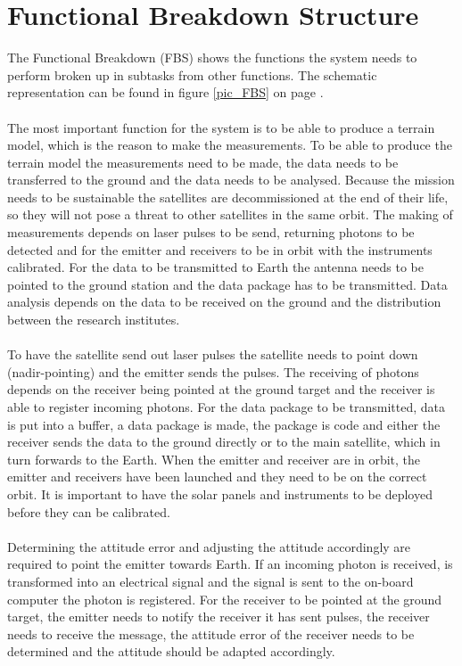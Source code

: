 \section{Functional Breakdown Structure}
The Functional Breakdown (FBS) shows the functions the system needs to perform broken up in subtasks from other functions. The schematic representation can be found in figure \ref{pic_FBS} on page \pageref{pic_FBS}.
\\ \\
The most important function for the system is to be able to produce a terrain model, which is the reason to make the measurements. To be able to produce the terrain model the measurements need to be made, the data needs to be transferred to the ground and the data needs to be analysed. Because the mission needs to be sustainable the satellites are decommissioned at the end of their life, so they will not pose a threat to other satellites in the same orbit.
The making of measurements depends on laser pulses to be send, returning photons to be detected and for the emitter and receivers to be in orbit with the instruments calibrated. For the data to be transmitted to Earth the antenna needs to be pointed to the ground station and the data package has to be transmitted. Data analysis depends on the data to be received on the ground and the distribution between the research institutes.
\\ \\
To have the satellite send out laser pulses the satellite needs to point down (nadir-pointing) and the emitter sends the pulses. The receiving of photons depends on the receiver being pointed at the ground target and the receiver is able to register incoming photons. For the data package to be transmitted, data is put into a buffer, a data package is made, the package is code and either the receiver sends the data to the ground directly or to the main satellite, which in turn forwards to the Earth. When the emitter and receiver are in orbit, the emitter and receivers have been launched and they need to be on the correct orbit. It is important to have the solar panels and instruments to be deployed before they can be calibrated.
\\ \\
Determining the attitude error and adjusting the attitude accordingly are required to point the emitter towards Earth. If an incoming photon is received, is transformed into an electrical signal and the signal is sent to the on-board computer the photon is registered. For the receiver to be pointed at the ground target, the emitter needs to notify the receiver it has sent pulses, the receiver needs to receive the message, the attitude error of the receiver needs to be determined and the attitude should be adapted accordingly. 

